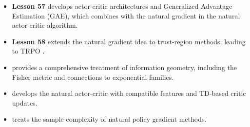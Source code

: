 \documentclass[11pt,a4paper]{article}
\begin{document}
\begin{itemize}
  \item \textbf{Lesson 57} develops actor-critic architectures and
    Generalized Advantage Estimation (GAE), which combines with the
    natural gradient in the natural actor-critic algorithm.

  \item \textbf{Lesson 58} extends the natural gradient idea to
    trust-region methods, leading to TRPO \citep{schulman2015trpo}.

  \item \citet{amari2016} provides a comprehensive treatment of
    information geometry, including the Fisher metric and connections
    to exponential families.

  \item \citet{peters2008} develops the natural actor-critic with
    compatible features and TD-based critic updates.

  \item \citet[Chapter 2]{kakade2003} treats the sample complexity of
    natural policy gradient methods.
\end{itemize}


\end{document}
